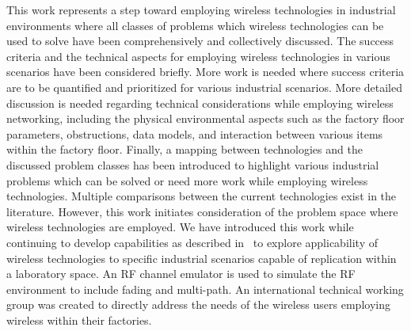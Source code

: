     This work represents a step toward employing wireless technologies in industrial environments where all classes of problems which wireless technologies can be used to solve have been comprehensively and collectively discussed. The success criteria and the technical aspects for employing wireless technologies in various scenarios have been considered briefly. More work is needed where success criteria are to be quantified and prioritized for various industrial scenarios. More detailed discussion is needed regarding technical considerations while employing wireless networking, including the physical environmental aspects such as the factory floor parameters, obstructions, data models, and interaction between various items within the factory floor. Finally, a mapping between technologies and the discussed problem classes has been introduced to highlight various industrial problems which can be solved or need more work while employing wireless technologies. Multiple comparisons between the current technologies exist in the literature. However, this work initiates consideration of the problem space where wireless technologies are employed. We have introduced this work while continuing to develop capabilities as described in~\cite{candell2015measuring} to explore applicability of wireless technologies to specific industrial scenarios capable of replication within a laboratory space. An RF channel emulator is used to simulate the RF environment to include fading and multi-path. An international technical working group was created to directly address the needs of the wireless users employing wireless within their factories.



